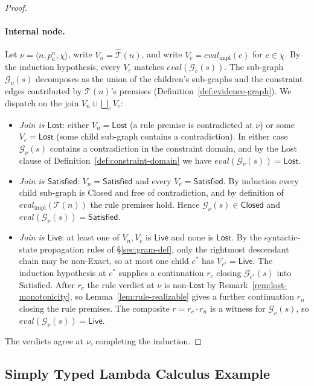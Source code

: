 \begin{proof}
	\paragraph{Internal node.} Let $\nu = \langle n, p^n_a, \chi \rangle$, write $V_n = \widehat{\mathcal T}(n)$, and write $V_c = \mathit{eval}_{\mathrm{impl}}(c)$ for $c \in \chi$. By the induction hypothesis, every $V_c$ matches $\mathit{eval}(\mathcal G_c(s))$. The sub-graph $\mathcal G_\nu(s)$ decomposes as the union of the children's sub-graphs and the constraint edges contributed by $\mathcal T(n)$'s premises (Definition~\ref{def:evidence-graph}). We dispatch on the join $V_n \sqcup \bigsqcup_c V_c$:
	\begin{itemize}
		\item \emph{Join is $\mathsf{Lost}$}: either $V_n = \mathsf{Lost}$ (a rule premise is contradicted at $\nu$) or some $V_c = \mathsf{Lost}$ (some child sub-graph contains a contradiction). In either case $\mathcal G_\nu(s)$ contains a contradiction in the constraint domain, and by the Lost clause of Definition~\ref{def:constraint-domain} we have $\mathit{eval}(\mathcal G_\nu(s)) = \mathsf{Lost}$.
		\item \emph{Join is $\mathsf{Satisfied}$}: $V_n = \mathsf{Satisfied}$ and every $V_c = \mathsf{Satisfied}$. By induction every child sub-graph is Closed and free of contradiction, and by definition of $\mathit{eval}_{\mathrm{impl}}(\mathcal T(n))$ the rule premises hold. Hence $\mathcal G_\nu(s) \in \mathsf{Closed}$ and $\mathit{eval}(\mathcal G_\nu(s)) = \mathsf{Satisfied}$.
		\item \emph{Join is $\mathsf{Live}$}: at least one of $V_n, V_c$ is $\mathsf{Live}$ and none is $\mathsf{Lost}$. By the syntactic-state propagation rules of \S\ref{sec:gram-def}, only the rightmost descendant chain may be non-Exact, so at most one child $c^\ast$ has $V_{c^\ast} = \mathsf{Live}$. The induction hypothesis at $c^\ast$ supplies a continuation $r_c$ closing $\mathcal G_{c^\ast}(s)$ into Satisfied. After $r_c$ the rule verdict at $\nu$ is non-$\mathsf{Lost}$ by Remark~\ref{rem:lost-monotonicity}, so Lemma~\ref{lem:rule-realizable} gives a further continuation $r_n$ closing the rule premises. The composite $r = r_c \cdot r_n$ is a witness for $\mathcal G_\nu(s)$, so $\mathit{eval}(\mathcal G_\nu(s)) = \mathsf{Live}$.
	\end{itemize}
	The verdicts agree at $\nu$, completing the induction.
\end{proof}


\subsection{Simply Typed Lambda Calculus Example}

